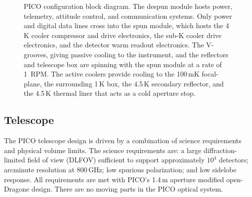 \begin{figure}[h]
\hspace{-0.in}
\parbox{4.1in}{ }
\hspace{0.12in}
\parbox{2.2in}{
\caption{\captiontext
PICO configuration block diagram. The despun module hosts power, telemetry, attitude control, and communication systems. Only power and digital data lines cross into the spun module, which hosts the 4\,K cooler compressor and drive electronics, the sub-K cooler drive electronics, and the detector warm readout electronics. The V-grooves, giving passive cooling to the instrument, and the reflectors and telescope box are spinning with the spun module at a rate of 1~RPM. The active coolers provide cooling to the 100\,mK focal-plane, the surrounding 1\,K box, the 4.5\,K secondary reflector, and the 4.5\,K thermal liner that acts as a cold aperture stop. 
\label{fig:ArchitectureBlockDiagram} } } 
\vspace{-0.in}
\end{figure}


\subsection{Telescope}
\label{sec:telescope} %

The PICO telescope design is driven by a combination of science requirements and physical volume limits. The science requirements are: a large diffraction-limited field of view (DLFOV) sufficient to support approximately $10^4$ detectors; arcminute resolution at 800\,GHz; low spurious polarization; and low sidelobe response. All requirements are met with PICO's 1.4\,m aperture modified open-Dragone design. There are no moving parts in the PICO optical system.


